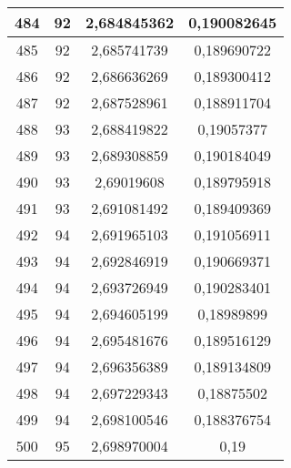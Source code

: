 {\begin{minipage}[!h]{0.45\textwidth}
\begin{longtable}{cccc}
484 & 92 & 2,684845362 & 0,190082645 \\ \hline
485 & 92 & 2,685741739 & 0,189690722 \\ \hline
486 & 92 & 2,686636269 & 0,189300412 \\ \hline
487 & 92 & 2,687528961 & 0,188911704 \\ \hline
488 & 93 & 2,688419822 & 0,19057377 \\ \hline
489 & 93 & 2,689308859 & 0,190184049 \\ \hline
490 & 93 & 2,69019608 & 0,189795918 \\ \hline
491 & 93 & 2,691081492 & 0,189409369 \\ \hline
492 & 94 & 2,691965103 & 0,191056911 \\ \hline
493 & 94 & 2,692846919 & 0,190669371 \\ \hline
494 & 94 & 2,693726949 & 0,190283401 \\ \hline
495 & 94 & 2,694605199 & 0,18989899 \\ \hline
496 & 94 & 2,695481676 & 0,189516129 \\ \hline
497 & 94 & 2,696356389 & 0,189134809 \\ \hline
498 & 94 & 2,697229343 & 0,18875502 \\ \hline
499 & 94 & 2,698100546 & 0,188376754 \\ \hline
500 & 95 & 2,698970004 & 0,19 \\ \hline
\end{longtable}
\end{minipage}

}
